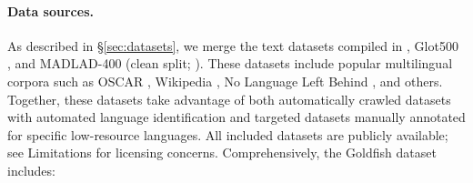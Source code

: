 \documentclass[11pt]{article}
\begin{document}
\paragraph{Data sources.}
As described in \S\ref{sec:datasets}, we merge the text datasets compiled in \citet{chang-etal-2023-multilinguality}, Glot500 \citep{imanigooghari-etal-2023-glot500}, and MADLAD-400 (clean split; \citealp{kudugunta-etal-2023-madlad400}).
These datasets include popular multilingual corpora such as OSCAR \citep{suarez2019asynchronous,AbadjiOrtizSuarezRomaryetal.2021}, Wikipedia \citep{wikipedia}, No Language Left Behind \citep{costa2022no}, and others.
Together, these datasets take advantage of both automatically crawled datasets with automated language identification and targeted datasets manually annotated for specific low-resource languages.
All included datasets are publicly available; see Limitations for licensing concerns.
Comprehensively, the Goldfish dataset includes:
\end{document}
